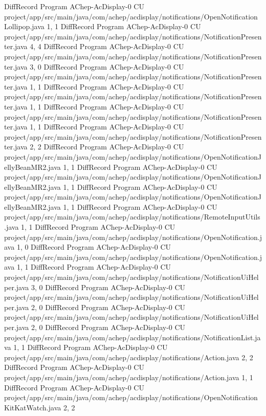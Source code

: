 DiffRecord Program AChep-AcDisplay-0 CU project/app/src/main/java/com/achep/acdisplay/notifications/OpenNotificationLollipop.java  {1, 1}
DiffRecord Program AChep-AcDisplay-0 CU project/app/src/main/java/com/achep/acdisplay/notifications/NotificationPresenter.java  {4, 4}
DiffRecord Program AChep-AcDisplay-0 CU project/app/src/main/java/com/achep/acdisplay/notifications/NotificationPresenter.java  {3, 0}
DiffRecord Program AChep-AcDisplay-0 CU project/app/src/main/java/com/achep/acdisplay/notifications/NotificationPresenter.java  {1, 1}
DiffRecord Program AChep-AcDisplay-0 CU project/app/src/main/java/com/achep/acdisplay/notifications/NotificationPresenter.java  {1, 1}
DiffRecord Program AChep-AcDisplay-0 CU project/app/src/main/java/com/achep/acdisplay/notifications/NotificationPresenter.java  {1, 1}
DiffRecord Program AChep-AcDisplay-0 CU project/app/src/main/java/com/achep/acdisplay/notifications/NotificationPresenter.java  {2, 2}
DiffRecord Program AChep-AcDisplay-0 CU project/app/src/main/java/com/achep/acdisplay/notifications/OpenNotificationJellyBeanMR2.java  {1, 1}
DiffRecord Program AChep-AcDisplay-0 CU project/app/src/main/java/com/achep/acdisplay/notifications/OpenNotificationJellyBeanMR2.java  {1, 1}
DiffRecord Program AChep-AcDisplay-0 CU project/app/src/main/java/com/achep/acdisplay/notifications/OpenNotificationJellyBeanMR2.java  {1, 1}
DiffRecord Program AChep-AcDisplay-0 CU project/app/src/main/java/com/achep/acdisplay/notifications/RemoteInputUtils.java  {1, 1}
DiffRecord Program AChep-AcDisplay-0 CU project/app/src/main/java/com/achep/acdisplay/notifications/OpenNotification.java  {1, 0}
DiffRecord Program AChep-AcDisplay-0 CU project/app/src/main/java/com/achep/acdisplay/notifications/OpenNotification.java  {1, 1}
DiffRecord Program AChep-AcDisplay-0 CU project/app/src/main/java/com/achep/acdisplay/notifications/NotificationUiHelper.java  {3, 0}
DiffRecord Program AChep-AcDisplay-0 CU project/app/src/main/java/com/achep/acdisplay/notifications/NotificationUiHelper.java  {2, 0}
DiffRecord Program AChep-AcDisplay-0 CU project/app/src/main/java/com/achep/acdisplay/notifications/NotificationUiHelper.java  {2, 0}
DiffRecord Program AChep-AcDisplay-0 CU project/app/src/main/java/com/achep/acdisplay/notifications/NotificationList.java  {1, 1}
DiffRecord Program AChep-AcDisplay-0 CU project/app/src/main/java/com/achep/acdisplay/notifications/Action.java  {2, 2}
DiffRecord Program AChep-AcDisplay-0 CU project/app/src/main/java/com/achep/acdisplay/notifications/Action.java  {1, 1}
DiffRecord Program AChep-AcDisplay-0 CU project/app/src/main/java/com/achep/acdisplay/notifications/OpenNotificationKitKatWatch.java  {2, 2}
